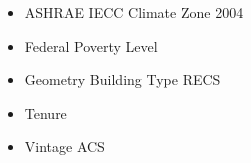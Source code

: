 \begin{itemize}
\item ASHRAE IECC Climate Zone 2004
\item Federal Poverty Level
\item Geometry Building Type RECS
\item Tenure
\item Vintage ACS
\end{itemize}
